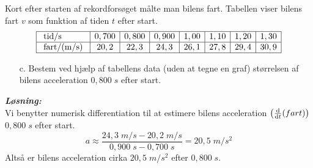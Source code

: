 \documentclass{report}
\newcommand{\sol}{\setlength{\parindent}{0cm}\textbf{\textit{Løsning:}}\setlength{\parindent}{1cm}}
\begin{document}
\pagebreak
\begin{question}{}{}
Kort efter starten af rekordforsøget målte man bilens fart. Tabellen viser bilens fart $v$ som funktion af tiden $t$ efter start.
$$
\begin{array}{|l|c|c|c|c|c|c|c|}
  \hline \text { tid/s } & 0,700 & 0,800 & 0,900 & 1,00 & 1,10 & 1,20 & 1,30 \\
  \hline \text { fart/(\unit{m/s}) } & 20,2 & 22,3 & 24,3 & 26,1 & 27,8 & 29,4 & 30,9 \\
\hline
\end{array}
$$
\begin{itemize}
  \item[c.] Bestem ved hjælp af tabellens data (uden at tegne en graf) størrelsen af bilens acceleration $0,800 \;\unit{s}$ efter start.
\end{itemize}
\end{question}
\sol \\ 
Vi benytter numerisk differentiation til at estimere bilens acceleration $\left(\dv{t}(fart)\right)$ $0,800 \;\unit{s}$ efter start.
\[
a \approx \frac{24,3\;\unit{m/s}-20,2\;\unit{m/s}}{0,900\;\unit{s}-0,700\;\unit{s}} = 20,5\;\unit{m/s^2}
\] 
Altså er bilens acceleration cirka $20,5\;\unit{m/s^2}$ efter $0,800 \;\unit{s}$.
\end{document}
